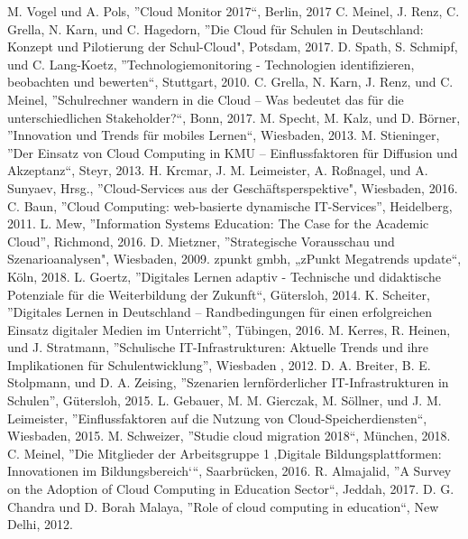 \documentclass[conference]{IEEEtran}
\begin{document}
\begin{thebibliography}{00}
M. Vogel und A. Pols, ''Cloud Monitor 2017“, Berlin, 2017
 C. Meinel, J. Renz, C. Grella, N. Karn, und C. Hagedorn, ''Die Cloud für Schulen in Deutschland: Konzept und Pilotierung der Schul-Cloud", Potsdam, 2017.
D. Spath, S. Schmipf, und C. Lang-Koetz, ''Technologiemonitoring - Technologien identifizieren, beobachten und bewerten“, Stuttgart, 2010.
 C. Grella, N. Karn, J. Renz, und C. Meinel, ''Schulrechner wandern in die Cloud – Was bedeutet das für die unterschiedlichen Stakeholder?“, Bonn, 2017.
 M. Specht, M. Kalz, und D. Börner, ''Innovation und Trends für mobiles Lernen“, Wiesbaden, 2013.
 M. Stieninger, ''Der Einsatz von Cloud Computing in KMU – Einflussfaktoren für Diffusion und Akzeptanz“, Steyr, 2013.
 H. Krcmar, J. M. Leimeister, A. Roßnagel, und A. Sunyaev, Hrsg., ''Cloud-Services aus der Geschäftsperspektive", Wiesbaden, 2016.
 C. Baun, ''Cloud Computing: web-basierte dynamische IT-Services'', Heidelberg, 2011.
 L. Mew, ''Information Systems Education: The Case for the Academic Cloud'', Richmond, 2016.
 D. Mietzner, ''Strategische Vorausschau und Szenarioanalysen", Wiesbaden, 2009.
zpunkt gmbh, „zPunkt Megatrends update“, Köln, 2018.
 L. Goertz, ''Digitales Lernen adaptiv - Technische und didaktische Potenziale für die Weiterbildung der Zukunft“, Gütersloh, 2014.
 K. Scheiter, ''Digitales Lernen in Deutschland – Randbedingungen für einen erfolgreichen Einsatz digitaler Medien im Unterricht'',  Tübingen, 2016.
 M. Kerres, R. Heinen, und J. Stratmann, ''Schulische IT-Infrastrukturen: Aktuelle Trends und ihre Implikationen für Schulentwicklung'',  Wiesbaden , 2012.
 D. A. Breiter, B. E. Stolpmann, und D. A. Zeising, ''Szenarien lernförderlicher IT-Infrastrukturen in Schulen'', Gütersloh, 2015.
 L. Gebauer, M. M. Gierczak, M. Söllner, und J. M. Leimeister, ''Einflussfaktoren auf die Nutzung von Cloud-Speicherdiensten“, Wiesbaden, 2015.
 M. Schweizer, ''Studie cloud migration 2018“, München, 2018.
 C. Meinel, ''Die Mitglieder der Arbeitsgruppe 1 ‚Digitale Bildungsplattformen: Innovationen im Bildungsbereich‘“, Saarbrücken, 2016.
 R. Almajalid, ''A Survey on the Adoption of Cloud Computing in Education Sector“, Jeddah, 2017.
 D. G. Chandra und D. Borah Malaya, ''Role of cloud computing in education“, New Delhi, 2012.

\end{thebibliography}
\end{document}
